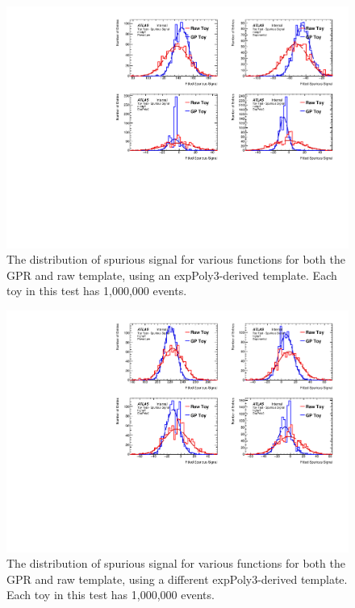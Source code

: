 \begin{figure} 
\begin{center}
  \includegraphics[width=\textwidth]{figures/background/gpr/validation/nominal/ToyTest_FitSigVals_medpT_1M_noSig}   
\caption{The distribution of spurious signal for various functions for both the GPR and raw template, using an expPoly3-derived template. Each toy in this test has 1,000,000 events.}
\label{fig:medpt_1M_noSig}
\end{center}
\end{figure}

\begin{figure} 
\begin{center}
  \includegraphics[width=\textwidth]{figures/background/gpr/validation/nominal/ToyTest_FitSigVals_highpT_1M_noSig}   
\caption{The distribution of spurious signal for various functions for both the GPR and raw template, using a different expPoly3-derived template. Each toy in this test has 1,000,000 events.}
\label{fig:highpt_1M_noSig}
\end{center}
\end{figure}

